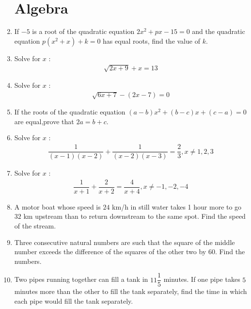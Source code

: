 \documentclass[12pt,-letter paper]{article}
\theoremstyle{remark}
\providecommand{\brak}[1]{\ensuremath{\left(#1\right)}}
\begin{document}
\begin{enumerate}
\section{Algebra}
\item If $-5$ is a root of the quadratic equation $2x^2+px-15=0$ and the quadratic equation $p\brak{x^2+x}+k=0 $ has equal roots, find the value of $k$. \\
\item Solve for $x$ : 
\begin{align*}\sqrt{2x+9} + x = 13\end{align*}
\item Solve for $x$ :
\begin{align*}\sqrt{6x+7}-\brak{2x-7}= 0\end{align*}
\item If the roots of the quadratic equation $\brak{a-b}x^2+\brak{b-c}x+\brak{c-a}=0$ are equal,prove that $2a=b+c$.\\
\item  Solve for $ x$ :  \begin{align*} \dfrac{1}{\brak{x-1}\brak{x-2}}  +  \dfrac{1}{\brak{x-2}\brak{x-3}}  =  \dfrac{2}{3} , x \neq 1,2,3\end{align*}
\item  Solve for $ x$ :  \begin{align*} \dfrac{1}{x+1}  + \dfrac{2}{x+2}  = \dfrac{4}{x+4} , x \neq -1,-2,-4 \end{align*} 
\item A motor boat whose speed is $24$ km/h in still water takes 1 hour more to go $32$ km upstream than to return downstream to the same spot. Find the speed of the stream.\\
\item Three consecutive natural numbers are such that the square of the middle number exceeds the difference of the squares of the other two by $60$. Find the numbers.\\
\item Two pipes running together can fill a tank in $11\dfrac{1}{5}$ minutes. If one pipe takes $5$ minutes more than the other to fill the tank separately, find the time in which each pipe would fill the tank separately.\\


\end{enumerate}
\end{document}
